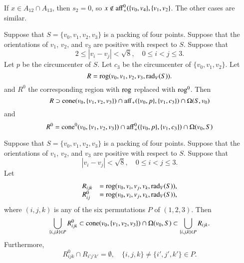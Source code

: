 \begin{tarskidata}
\begin{tarski}
\begin{proved}
If $x\in A_{12}\cap A_{13}$, then $s_2=0$, so $x\not\in{\operatorname{aff}}_+^0(\{v_0,v_4\},\{v_1,v_2\}$.  The other cases are similar.
\swallowed\end{proved}
\end{tarski}





\begin{tarski}

\begin{lemma}
Suppose that $S=\{v_0,v_1,v_2,v_3\}$ is a packing
of four points.  Suppose that 
the orientations of $v_1$, $v_2$, and $v_3$ are positive with respect
to $S$.  Suppose that 
  $$
  2 \le |v_i - v_j | < \sqrt8, \quad 0\le i < j \le 3.
  $$
Let $p$ be the circumcenter of $S$.  Let $c_3$
be the circumcenter of $\{v_0,v_1,v_2\}$.
Let 
   $$
   R = {\operatorname{rog}}(v_0,v_1,v_2,v_3,\operatorname{rad}_V(S)).
   $$
and $R^0$ the corresponding region with ${\operatorname{rog}}$ replaced
with ${\operatorname{rog}}^0$.
Then 
$$
 R \supset {\operatorname{cone}}(v_0,\{v_1,v_2,v_3\})\cap
  {\operatorname{aff}}_+(\{v_0,p\},\{v_1,c_3\}) \cap
  \Omega(S,v_0)
$$ 
and 
$$
 R^0 = {\operatorname{cone}}^0(v_0,\{v_1,v_2,v_3\})\cap
  {\operatorname{aff}}^0_+(\{v_0,p\},\{v_1,c_3\}) \cap
  \Omega(v_0,S)
$$ 
\end{lemma}

\begin{proved}
\swallowed\end{proved}
\end{tarski}




\begin{tarski}

\begin{lemma}
Suppose that $S=\{v_0,v_1,v_2,v_3\}$ is a packing
of four points.  Suppose that 
the orientations of $v_1$, $v_2$, and $v_3$ are positive with respect
to $S$.  Suppose that 
  $$
  |v_i - v_j | < \sqrt8, \quad 0\le i < j \le 3.
  $$
Let 
   $$
   \begin{array}{lll}
   R_{ijk} &= {\operatorname{rog}}(v_0,v_i,v_j,v_k,\operatorname{rad}_V(S)),\\
   R^0_{ij} &= {\operatorname{rog}}(v_0,v_i,v_j,v_k,\operatorname{rad}_V(S)),
   \end{array}
   $$
where $(i,j,k)$ is any of the six permutations $P$ of $(1,2,3)$.
Then
   $$
   \bigcup_{\{i,j,k\}\in P} R_{ijk}^0\subset
   {\operatorname{cone}}(v_0,\{v_1,v_2,v_3\})\cap \Omega(v_0,S) \subset
   \bigcup_{\{i,j,k\}\in P} R_{ijk}.
   $$
Furthermore,
   $$
   R_{ijk}^0 \cap R_{i'j'k'} =\emptyset,\quad
   \{i,j,k\}\ne\{i',j',k'\}\in P.
   $$
\end{lemma}


\end{tarski}
\end{tarskidata}
